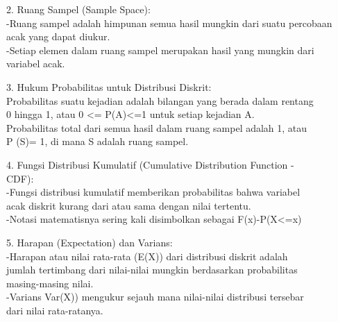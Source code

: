 \documentclass[a4paper,10pt]{article}
\begin{document}
\begin{eulernotebook}
\begin{eulercomment}
\begin{eulercomment}
\begin{eulercomment}
\begin{eulercomment}
\begin{eulercomment}
\begin{eulercomment}
\begin{eulercomment}
\begin{eulercomment}
\begin{eulerttcomment}
\end{eulerttcomment}
\begin{eulercomment}
2. Ruang Sampel (Sample Space):\\
-Ruang sampel adalah himpunan semua hasil mungkin dari suatu percobaan\\
acak yang dapat diukur.\\
-Setiap elemen dalam ruang sampel merupakan hasil yang mungkin dari\\
variabel acak.\\
\end{eulercomment}
\begin{eulerttcomment}
 
\end{eulerttcomment}
\begin{eulercomment}
3. Hukum Probabilitas untuk Distribusi Diskrit:\\
Probabilitas suatu kejadian adalah bilangan yang berada dalam rentang\\
0 hingga 1, atau 0 \textless{}= P(A)\textless{}=1 untuk setiap kejadian A.\\
Probabilitas total dari semua hasil dalam ruang sampel adalah 1, atau\\
P (S)= 1, di mana S adalah ruang sampel.\\
\end{eulercomment}
\begin{eulerttcomment}
 
\end{eulerttcomment}
\begin{eulercomment}
4. Fungsi Distribusi Kumulatif (Cumulative Distribution Function -\\
CDF):\\
-Fungsi distribusi kumulatif memberikan probabilitas bahwa variabel\\
acak diskrit kurang dari atau sama dengan nilai tertentu.\\
-Notasi matematisnya sering kali disimbolkan sebagai F(x)-P(X\textless{}=x)\\
\end{eulercomment}
\begin{eulerttcomment}
 
\end{eulerttcomment}
\begin{eulercomment}
5. Harapan (Expectation) dan Varians:\\
-Harapan atau nilai rata-rata (E(X)) dari distribusi diskrit adalah\\
jumlah tertimbang dari nilai-nilai mungkin berdasarkan probabilitas\\
masing-masing nilai.\\
-Varians Var(X)) mengukur sejauh mana nilai-nilai distribusi tersebar\\
dari nilai rata-ratanya.


\end{eulercomment}
\end{eulercomment}
\end{eulercomment}
\end{eulercomment}
\end{eulercomment}
\end{eulercomment}
\end{eulercomment}
\end{eulercomment}
\end{eulercomment}
\end{eulernotebook}
\end{document}
